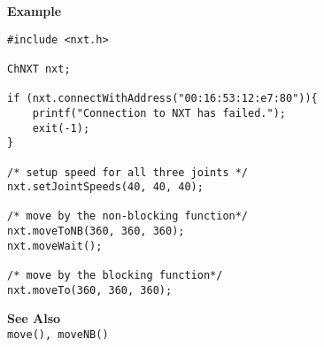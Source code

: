 \noindent
{\bf Example}
\begin{verbatim}
#include <nxt.h> 

ChNXT nxt;

if (nxt.connectWithAddress("00:16:53:12:e7:80")){
    printf("Connection to NXT has failed.");
    exit(-1);
}
 
/* setup speed for all three joints */
nxt.setJointSpeeds(40, 40, 40);

/* move by the non-blocking function*/
nxt.moveToNB(360, 360, 360);
nxt.moveWait();

/* move by the blocking function*/
nxt.moveTo(360, 360, 360);
\end{verbatim}

\noindent
{\bf See Also}\\
{\tt move(), moveNB()}\\
